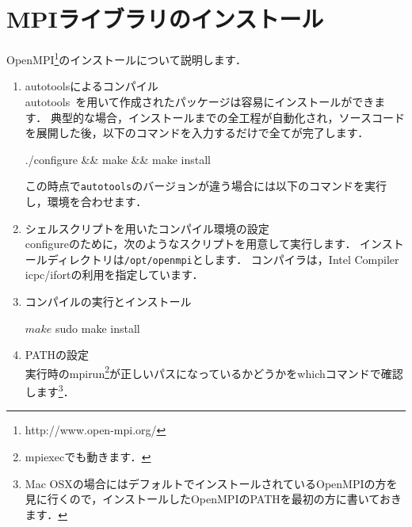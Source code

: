 \section{MPIライブラリのインストール}

OpenMPI\footnote{http://www.open-mpi.org/}のインストールについて説明します．

\begin{enumerate}
\item autotoolsによるコンパイル\\
autotools~\cite{autotools}を用いて作成されたパッケージは容易にインストールができます．
典型的な場合，インストールまでの全工程が自動化され，ソースコードを展開した後，以下のコマンドを入力するだけで全てが完了します．
{\small
\begin{program}
./configure && make && make install
\end{program}
}

この時点で\verb|autotools|のバージョンが違う場合には以下のコマンドを実行し，環境を合わせます．

{\small
{}
}

\item シェルスクリプトを用いたコンパイル環境の設定\\
configureのために，次のようなスクリプトを用意して実行します．
インストールディレクトリは\verb|/opt/openmpi|とします．
コンパイラは，Intel Compiler icpc/ifortの利用を指定しています．

{\small
{}
}

\item コンパイルの実行とインストール\\
{\small
\begin{program}
$ make
$ sudo make install
\end{program}
}

\item PATHの設定\\
実行時のmpirun\footnote{mpiexecでも動きます．}が正しいパスになっているかどうかをwhichコマンドで確認します\footnote{Mac OSXの場合にはデフォルトでインストールされているOpenMPIの方を見に行くので，インストールしたOpenMPIのPATHを最初の方に書いておきます．}．


\end{enumerate}
